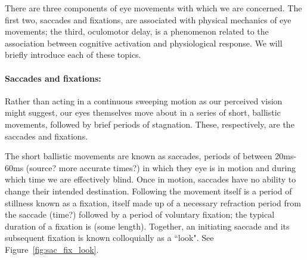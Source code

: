 \documentclass{article}
\begin{document}
There are three components of eye movements with which we are concerned. The first two, saccades and fixations, are associated with physical mechanics of eye movements; the third, oculomotor delay, is a phenomenon related to the association between cognitive activation and physiological response. We will briefly introduce each of these topics. 

\paragraph{Saccades and fixations:} Rather than acting in a continuous sweeping motion as our perceived vision might suggest, our eyes themselves move about in a series of short, ballistic movements, followed by brief periods of stagnation. These, respectively, are the saccades and fixations. 

The short ballistic movements are known as saccades, periods of between 20ms-60ms (source? more accurate times?) in which they eye is in motion and during which time we are effectively blind. Once in motion, saccades have no ability to change their intended destination. Following the movement itself is a period of stillness known as a fixation, itself made up of a necessary refraction period from the saccade (time?) followed by a period of voluntary fixation; the typical duration of a fixation is (some length). Together, an initiating saccade and its subsequent fixation is known colloquially as a ``look". See Figure~\ref{fig:sac_fix_look}.
\end{document}
